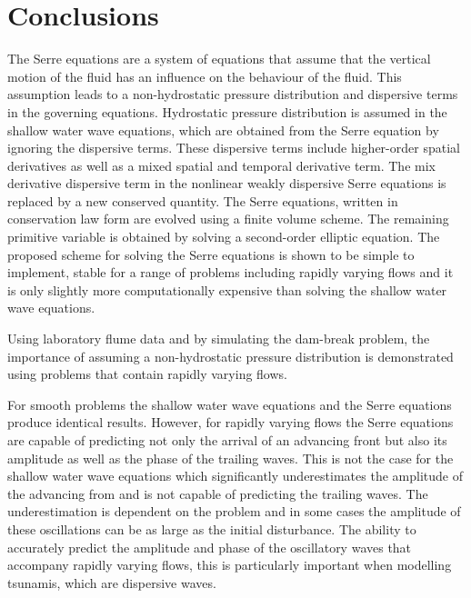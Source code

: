 \documentclass[SingleSpace,12pt]{Serre_ASCE}
\begin{document}
\section{Conclusions}
\label{section:Conclusions}

The Serre equations are a system of equations that assume that the vertical motion of the fluid has an influence on the behaviour of the fluid. This assumption leads to a non-hydrostatic pressure distribution and dispersive terms in the governing equations. Hydrostatic pressure distribution is assumed in the shallow water wave equations, which are obtained from the Serre equation by ignoring the dispersive terms. These dispersive terms include higher-order spatial derivatives as well as a mixed spatial and temporal derivative term. The mix derivative dispersive term in the nonlinear weakly dispersive Serre equations is replaced by a new conserved quantity. The Serre equations, written in conservation law form are evolved using a finite volume scheme. The remaining primitive variable is obtained by solving a second-order elliptic equation. The proposed scheme for solving the Serre equations is shown to be simple to implement, stable for a range of problems including rapidly varying flows and it is only slightly more computationally expensive than solving the shallow water wave equations.

Using laboratory flume data and by simulating the dam-break problem, the importance of assuming a non-hydrostatic pressure distribution is demonstrated using problems that contain rapidly varying flows.

For smooth problems the shallow water wave equations and the Serre equations produce identical results. However, for rapidly varying flows the Serre equations are capable of predicting not only the arrival of an advancing front but also its amplitude as well as the phase of the trailing waves. This is not the case for the shallow water wave equations which significantly underestimates the amplitude of the advancing from and is not capable of predicting the trailing waves. The underestimation is dependent on the problem and in some cases the amplitude of these oscillations can be as large as the initial disturbance. The ability to accurately predict the amplitude and phase of the oscillatory waves that accompany rapidly varying flows, this is particularly important when modelling tsunamis, which are dispersive waves.
\end{document}
